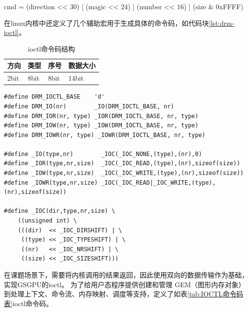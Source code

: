 cmd = (direction << 30) | (magic << 24) | (number << 16) | (size \& 0xFFFF)

在linux内核中还定义了几个辅助宏用于生成具体的命令码，如代码块\ref{lst:drm-ioctl}。

\begin{table}[h]
  \centering
  \caption{ioctl命令码结构}
  \label{tab:ioctl命令码结构}
  \begin{tabular}{llll}
    \toprule
    方向  & 类型 & 序号 & 数据大小 \\
    \midrule
    2bit & 8bit & 8bit & 14bit \\
    \bottomrule
  \end{tabular}
  \note{}
\end{table}


\begin{lstlisting}[label={lst:drm-ioctl}]
#define DRM_IOCTL_BASE    'd'
#define DRM_IO(nr)        _IO(DRM_IOCTL_BASE, nr)
#define DRM_IOR(nr, type) _IOR(DRM_IOCTL_BASE, nr, type)
#define DRM_IOW(nr, type) _IOW(DRM_IOCTL_BASE, nr, type)
#define DRM_IOWR(nr, type) _IOWR(DRM_IOCTL_BASE, nr, type)

#define _IO(type,nr)        _IOC(_IOC_NONE,(type),(nr),0)
#define _IOR(type,nr,size)  _IOC(_IOC_READ,(type),(nr),sizeof(size))
#define _IOW(type,nr,size)  _IOC(_IOC_WRITE,(type),(nr),sizeof(size))
#define _IOWR(type,nr,size) _IOC(_IOC_READ|_IOC_WRITE,(type),(nr),sizeof(size))

#define _IOC(dir,type,nr,size) \
    ((unsigned int) \
    (((dir)  << _IOC_DIRSHIFT) | \
     ((type) << _IOC_TYPESHIFT) | \
     ((nr)   << _IOC_NRSHIFT) | \
     ((size) << _IOC_SIZESHIFT)))
\end{lstlisting}


在课题场景下，需要将内核调用的结果返回，因此使用双向的数据传输作为基础，实现GSGPU的ioctl。
为了给用户态程序提供创建和管理 GEM（图形内存对象）到处理上下文、命令流、内存映射、调度等支持，定义了如表\ref{tab:IOCTL命令码表}ioctl命令码。

